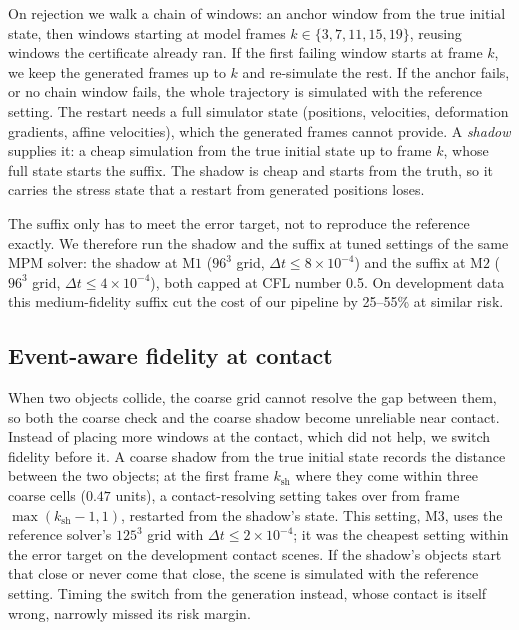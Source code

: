 On rejection we walk a chain of windows: an anchor window from the true initial state, then windows starting at model frames $k \in \{3, 7, 11, 15, 19\}$, reusing windows the certificate already ran.
If the first failing window starts at frame $k$, we keep the generated frames up to $k$ and re-simulate the rest.
If the anchor fails, or no chain window fails, the whole trajectory is simulated with the reference setting.
The restart needs a full simulator state (positions, velocities, deformation gradients, affine velocities), which the generated frames cannot provide.
A \emph{shadow} supplies it: a cheap simulation from the true initial state up to frame $k$, whose full state starts the suffix.
The shadow is cheap and starts from the truth, so it carries the stress state that a restart from generated positions loses.

The suffix only has to meet the error target, not to reproduce the reference exactly.
We therefore run the shadow and the suffix at tuned settings of the same MPM solver:
the shadow at $\mathrm{M1}$ ($96^3$ grid, $\Delta t \le 8{\times}10^{-4}$) and the suffix at $\mathrm{M2}$ ($96^3$ grid, $\Delta t \le 4{\times}10^{-4}$), both capped at CFL number 0.5.
On development data this medium-fidelity suffix cut the cost of our pipeline by 25--55\% at similar risk.

\subsection{Event-aware fidelity at contact}
\label{sec:fidelity}
When two objects collide, the coarse grid cannot resolve the gap between them, so both the coarse check and the coarse shadow become unreliable near contact.
Instead of placing more windows at the contact, which did not help, we switch fidelity before it.
A coarse shadow from the true initial state records the distance between the two objects; at the first frame $k_{\mathrm{sh}}$ where they come within three coarse cells ($0.47$ units), a contact-resolving setting takes over from frame $\max(k_{\mathrm{sh}}-1, 1)$, restarted from the shadow's state.
This setting, $\mathrm{M3}$, uses the reference solver's $125^3$ grid with $\Delta t \le 2{\times}10^{-4}$; it was the cheapest setting within the error target on the development contact scenes.
If the shadow's objects start that close or never come that close, the scene is simulated with the reference setting.
Timing the switch from the generation instead, whose contact is itself wrong, narrowly missed its risk margin.

